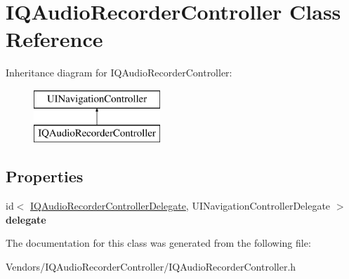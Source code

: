 \hypertarget{interface_i_q_audio_recorder_controller}{}\section{I\+Q\+Audio\+Recorder\+Controller Class Reference}
\label{interface_i_q_audio_recorder_controller}
Inheritance diagram for I\+Q\+Audio\+Recorder\+Controller\+:\begin{figure}[H]
\begin{center}
\leavevmode
\includegraphics[height=2.000000cm]{interface_i_q_audio_recorder_controller}
\end{center}
\end{figure}
\subsection*{Properties}
\begin{DoxyCompactItemize}
\item 
\hypertarget{interface_i_q_audio_recorder_controller_a00d8f3ad2caca2c33b1509d4f6d7b738}{}id$<$ \hyperlink{protocol_i_q_audio_recorder_controller_delegate-p}{I\+Q\+Audio\+Recorder\+Controller\+Delegate}, U\+I\+Navigation\+Controller\+Delegate $>$ {\bfseries delegate}\label{interface_i_q_audio_recorder_controller_a00d8f3ad2caca2c33b1509d4f6d7b738}

\end{DoxyCompactItemize}


The documentation for this class was generated from the following file\+:\begin{DoxyCompactItemize}
\item 
Vendors/\+I\+Q\+Audio\+Recorder\+Controller/I\+Q\+Audio\+Recorder\+Controller.\+h\end{DoxyCompactItemize}
